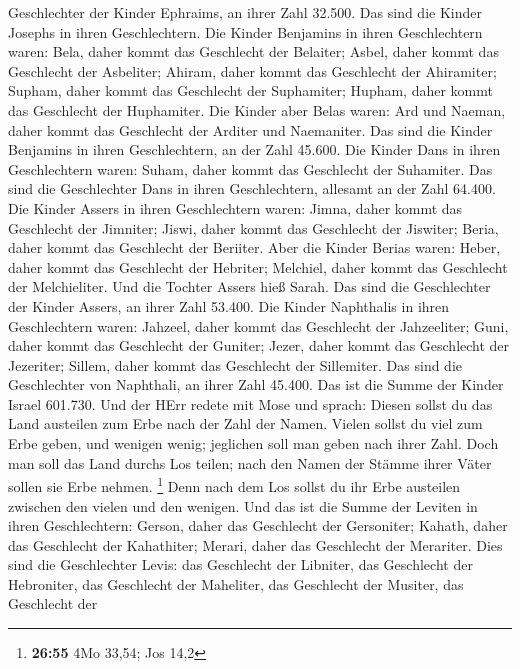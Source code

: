Geschlechter der Kinder Ephraims, an ihrer Zahl 32.500. Das sind die
Kinder Josephs in ihren Geschlechtern.  Die Kinder
Benjamins in ihren Geschlechtern waren: Bela, daher kommt das Geschlecht
der Belaiter; Asbel, daher kommt das Geschlecht der Asbeliter; Ahiram,
daher kommt das Geschlecht der Ahiramiter;  Supham, daher
kommt das Geschlecht der Suphamiter; Hupham, daher kommt das Geschlecht
der Huphamiter.  Die Kinder aber Belas waren: Ard und
Naeman, daher kommt das Geschlecht der Arditer und Naemaniter.
 Das sind die Kinder Benjamins in ihren Geschlechtern, an
der Zahl 45.600.  Die Kinder Dans in ihren Geschlechtern
waren: Suham, daher kommt das Geschlecht der Suhamiter. 
Das sind die Geschlechter Dans in ihren Geschlechtern, allesamt an der
Zahl 64.400.  Die Kinder Assers in ihren Geschlechtern
waren: Jimna, daher kommt das Geschlecht der Jimniter; Jiswi, daher
kommt das Geschlecht der Jiswiter; Beria, daher kommt das Geschlecht der
Beriiter.  Aber die Kinder Berias waren: Heber, daher kommt
das Geschlecht der Hebriter; Melchiel, daher kommt das Geschlecht der
Melchieliter.  Und die Tochter Assers hieß Sarah.
 Das sind die Geschlechter der Kinder Assers, an ihrer Zahl
53.400.  Die Kinder Naphthalis in ihren Geschlechtern
waren: Jahzeel, daher kommt das Geschlecht der Jahzeeliter; Guni, daher
kommt das Geschlecht der Guniter;  Jezer, daher kommt das
Geschlecht der Jezeriter; Sillem, daher kommt das Geschlecht der
Sillemiter.  Das sind die Geschlechter von Naphthali, an
ihrer Zahl 45.400.  Das ist die Summe der Kinder Israel
601.730.  Und der HErr redete mit Mose und sprach:
 Diesen sollst du das Land austeilen zum Erbe nach der Zahl
der Namen.  Vielen sollst du viel zum Erbe geben, und
wenigen wenig; jeglichen soll man geben nach ihrer Zahl. 
Doch man soll das Land durchs Los teilen; nach den Namen der Stämme
ihrer Väter sollen sie Erbe nehmen. \footnote{\textbf{26:55} 4Mo 33,54;
  Jos 14,2}  Denn nach dem Los sollst du ihr Erbe austeilen
zwischen den vielen und den wenigen.  Und das ist die Summe
der Leviten in ihren Geschlechtern: Gerson, daher das Geschlecht der
Gersoniter; Kahath, daher das Geschlecht der Kahathiter; Merari, daher
das Geschlecht der Merariter.  Dies sind die Geschlechter
Levis: das Geschlecht der Libniter, das Geschlecht der Hebroniter, das
Geschlecht der Maheliter, das Geschlecht der Musiter, das Geschlecht der
